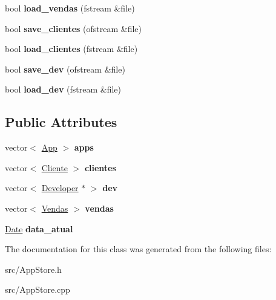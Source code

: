 \begin{DoxyCompactItemize}
\item 
\hypertarget{class_app_store_ab3f434aea433599fa9905068d052060d}{bool {\bfseries load\+\_\+vendas} (fstream \&file)}\label{class_app_store_ab3f434aea433599fa9905068d052060d}

\item 
\hypertarget{class_app_store_a347e9f40006f1b33ff4875b7338aa8c5}{bool {\bfseries save\+\_\+clientes} (ofstream \&file)}\label{class_app_store_a347e9f40006f1b33ff4875b7338aa8c5}

\item 
\hypertarget{class_app_store_a10cadeff1412d5cdb49c806746878b7d}{bool {\bfseries load\+\_\+clientes} (fstream \&file)}\label{class_app_store_a10cadeff1412d5cdb49c806746878b7d}

\item 
\hypertarget{class_app_store_a86f8c8d69a134c570ee1ac5208204b35}{bool {\bfseries save\+\_\+dev} (ofstream \&file)}\label{class_app_store_a86f8c8d69a134c570ee1ac5208204b35}

\item 
\hypertarget{class_app_store_ad45df395b61443556fd84f40cdcbd208}{bool {\bfseries load\+\_\+dev} (fstream \&file)}\label{class_app_store_ad45df395b61443556fd84f40cdcbd208}

\end{DoxyCompactItemize}
\subsection*{Public Attributes}
\begin{DoxyCompactItemize}
\item 
\hypertarget{class_app_store_ab618a846f9c32b6897bf3e694af19c43}{vector$<$ \hyperlink{class_app}{App} $>$ {\bfseries apps}}\label{class_app_store_ab618a846f9c32b6897bf3e694af19c43}

\item 
\hypertarget{class_app_store_a6f1aa46e983d0e8fecd103c47c8f7eea}{vector$<$ \hyperlink{class_cliente}{Cliente} $>$ {\bfseries clientes}}\label{class_app_store_a6f1aa46e983d0e8fecd103c47c8f7eea}

\item 
\hypertarget{class_app_store_af62367eceae89987728c11c70318a93a}{vector$<$ \hyperlink{class_developer}{Developer} $\ast$ $>$ {\bfseries dev}}\label{class_app_store_af62367eceae89987728c11c70318a93a}

\item 
\hypertarget{class_app_store_a0b519316efd39486e4577dc95f1dfea3}{vector$<$ \hyperlink{class_vendas}{Vendas} $>$ {\bfseries vendas}}\label{class_app_store_a0b519316efd39486e4577dc95f1dfea3}

\item 
\hypertarget{class_app_store_a5d50396ada945dfa3e439d28650a3aee}{\hyperlink{class_date}{Date} {\bfseries data\+\_\+atual}}\label{class_app_store_a5d50396ada945dfa3e439d28650a3aee}

\end{DoxyCompactItemize}


The documentation for this class was generated from the following files\+:\begin{DoxyCompactItemize}
\item 
src/App\+Store.\+h\item 
src/App\+Store.\+cpp\end{DoxyCompactItemize}
